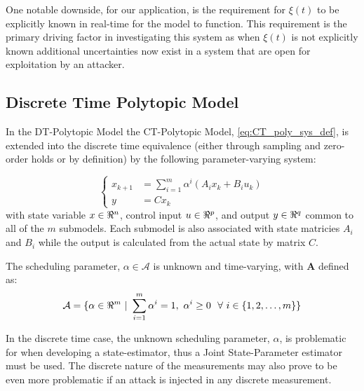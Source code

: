 \documentclass[]{article}
\begin{document}
One notable downside, for our application, is the requirement for $\xi(t)$ to be explicitly known in real-time for the model to function. This requirement is the primary driving factor in investigating this system as when $\xi(t)$ is not explicitly known additional uncertainties now exist in a system that are open for exploitation by an attacker.


\subsection{Discrete Time Polytopic Model}
In the DT-Polytopic Model the CT-Polytopic Model, \eqref{eq:CT_poly_sys_def}, is extended into the discrete time equivalence (either through sampling and zero-order holds or by definition) by the following parameter-varying system:

\begin{equation}
	\begin{cases}
		x_{k+1} &= \sum_{i=1}^{m} \alpha^i (A_i x_k + B_i u_k)\\
		y		&= C x_k
	\end{cases}
\end{equation}
with state variable $x \in \real^n$, control input $u \in \real^p$, and output $y \in \real^q$ common to all of the $m$ submodels. Each submodel is also associated with state matricies $A_i$ and $B_i$ while the output is calculated from the actual state by matrix $C$.

The scheduling parameter, $\alpha \in \mathcal{A}$ is unknown and time-varying, with $\mathbf{A}$ defined as:
\begin{equation}
	\mathcal{A} = \{\alpha\in \real^m \ | \ \sum_{i=1}^m \alpha^i = 1, \ \alpha^i \geq 0 \ \ \forall \ i \in \{1,2,\dots,m\}\}
\end{equation}

In the discrete time case, the unknown scheduling parameter, $\alpha$, is problematic for when developing a state-estimator, thus a Joint State-Parameter estimator must be used. The discrete nature of the measurements may also prove to be even more problematic if an attack is injected in any discrete measurement.











\newpage
\end{document}
